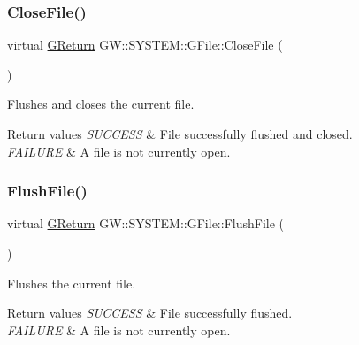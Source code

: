 \subsubsection{\texorpdfstring{Close\+File()}{CloseFile()}}
{\footnotesize\ttfamily virtual \hyperlink{namespaceGW_a67a839e3df7ea8a5c5686613a7a3de21}{G\+Return} G\+W\+::\+S\+Y\+S\+T\+E\+M\+::\+G\+File\+::\+Close\+File (\begin{DoxyParamCaption}{ }\end{DoxyParamCaption})\hspace{0.3cm}{\ttfamily [pure virtual]}}



Flushes and closes the current file. 


\begin{DoxyRetVals}{Return values}
{\em S\+U\+C\+C\+E\+SS} & File successfully flushed and closed. \\
\hline
{\em F\+A\+I\+L\+U\+RE} & A file is not currently open. \\
\hline
\end{DoxyRetVals}
\mbox{\label{classGW_1_1SYSTEM_1_1GFile_ae3105b637ef87af268722a696b8657a9}} 
\subsubsection{\texorpdfstring{Flush\+File()}{FlushFile()}}
{\footnotesize\ttfamily virtual \hyperlink{namespaceGW_a67a839e3df7ea8a5c5686613a7a3de21}{G\+Return} G\+W\+::\+S\+Y\+S\+T\+E\+M\+::\+G\+File\+::\+Flush\+File (\begin{DoxyParamCaption}{ }\end{DoxyParamCaption})\hspace{0.3cm}{\ttfamily [pure virtual]}}



Flushes the current file. 


\begin{DoxyRetVals}{Return values}
{\em S\+U\+C\+C\+E\+SS} & File successfully flushed. \\
\hline
{\em F\+A\+I\+L\+U\+RE} & A file is not currently open. \\
\hline
\end{DoxyRetVals}
\mbox{\label{classGW_1_1SYSTEM_1_1GFile_a6853b717e838d1b3a54f22449a37d764}} 
